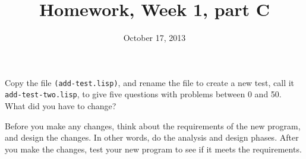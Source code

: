 \documentclass{article}
\title{Homework, Week 1, part C}
\date{October 17, 2013}
\begin{document}
\maketitle{}

Copy the file \texttt{(add-test.lisp)}, and rename the file to create a new test, call it \texttt{add-test-two.lisp}, to give five questions with problems between 0 and 50. What did you have to change?

 Before you make any changes, think about the requirements of the new program, and design the changes. In other words, do the analysis and design phases. After you make the changes, test your new program to see if it meets the requirements.
\end{document}
